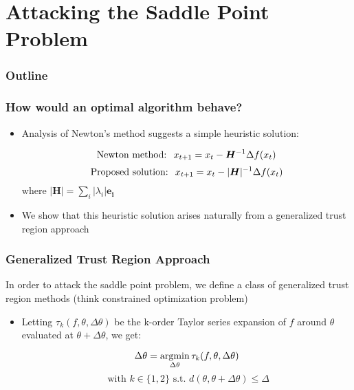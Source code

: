 \documentclass{beamer}
\begin{document}

\section{Attacking the Saddle Point Problem}
\begin{frame}
\frametitle{Outline}
\tableofcontents[currentsection]
\end{frame}


\begin{frame}
\frametitle{How would an optimal algorithm behave?}
\vspace{-0.25in}
\pause
\begin{itemize}
\item{Analysis of Newton's method suggests a simple heuristic solution:

$$ \text{Newton method: \hspace{0.04in}} x_{t+1} = x_t - \bm{H}^{-1} \Delta f(x_t) $$
\pause
$$ \text{Proposed solution: \hspace{0.04in}} x_{t+1} = x_t - |\bm{H}|^{-1} \Delta f(x_t)$$
\vspace{0.06in}
where $|\bm{H}| = \sum_i |\lambda_i| \bm{e_i}$ 
}
\pause
\vspace{0.1in}
\item{We show that this heuristic solution arises naturally from a generalized trust region approach}
\end{itemize}
\end{frame}

\begin{frame}
\frametitle{Generalized Trust Region Approach}

\vspace{-0.25in}

In order to attack the saddle point problem, we define a class of generalized trust region methods (think constrained optimization problem)
\pause
\vspace{0.25in}
\begin{itemize}

\item{Letting $\tau_{k}(f,\theta,\Delta \theta)$ be the k-order Taylor series expansion of $f$ around $\theta$ evaluated at $\theta + \Delta\theta$, we get:

$$ \Delta \theta = \mathop{\mathrm{argmin}}_{\Delta \theta} \tau_{k}(f,\theta,\Delta \theta) $$ $$\text{ with } k \in \{1,2\} \text{ s.t. } d(\theta,\theta+\Delta\theta) \leq \Delta$$}

\end{itemize}
\end{frame}
\end{document}
